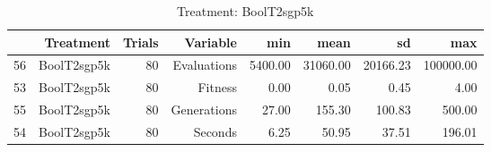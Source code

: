 \begin{table}[ht]
\centering
\begin{tabular}{rrrrrrrr}
  \hline
 & Treatment & Trials & Variable & min & mean & sd & max \\ 
  \hline
56 & BoolT2sgp5k &  80 & Evaluations & 5400.00 & 31060.00 & 20166.23 & 100000.00 \\ 
  53 & BoolT2sgp5k &  80 & Fitness & 0.00 & 0.05 & 0.45 & 4.00 \\ 
  55 & BoolT2sgp5k &  80 & Generations & 27.00 & 155.30 & 100.83 & 500.00 \\ 
  54 & BoolT2sgp5k &  80 & Seconds & 6.25 & 50.95 & 37.51 & 196.01 \\ 
   \hline
\end{tabular}
\caption{Treatment: BoolT2sgp5k} 
\end{table}
